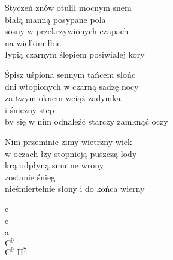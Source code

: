 \begin{text}
    Styczeń znów otulił mocnym snem\\
    białą manną posypane pola\\
    sosny w przekrzywionych czapach\\
    na wielkim łbie\\
    łypią czarnym ślepiem posiwiałej kory

    Śpisz uśpiona sennym tańcem słońc\\
    dni wtopionych w czarną sadzę nocy\\
    za twym oknem wciąż zadymka\\
    i śnieżny step\\
    by się w nim odnaleźć starczy zamknąć oczy

    Nim przeminie zimy wietrzny wiek\\
    w oczach łzy stopnieją puszczą lody\\
    krą odpłyną smutne wrony\\
    zostanie śnieg\\
    nieśmiertelnie słony i do końca wierny
\end{text}
\begin{chord}
    e\\
    e\\
    a\\
    $\mathrm{C^9}$\\
    $\mathrm{C^9}$ $\mathrm{H^7}$
\end{chord}
